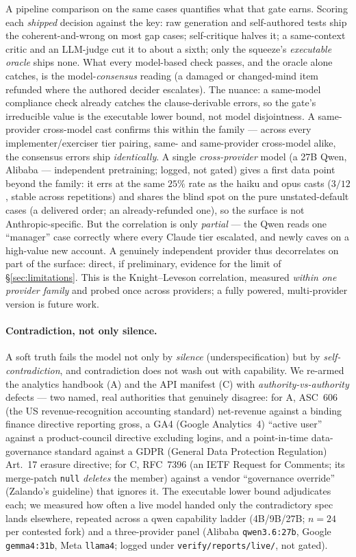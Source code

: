 \documentclass[11pt]{article}
\newcommand{\code}[1]{\texttt{#1}}
\begin{document}
A pipeline comparison on the same cases quantifies what that gate earns. Scoring each
\emph{shipped} decision against the key: raw generation and self-authored tests ship the
coherent-and-wrong on most gap cases; self-critique halves it; a same-context critic and an
LLM-judge cut it to about a sixth; only the squeeze's \emph{executable oracle} ships none. What
every model-based check passes, and the oracle alone catches, is the model-\emph{consensus}
reading (a damaged or changed-mind item refunded where the authored decider escalates). The
nuance: a same-model compliance check already catches the clause-derivable errors, so the gate's
irreducible value is the executable lower bound, not model disjointness. A same-provider cross-model
cast confirms this within the family --- across every implementer/exerciser tier pairing, same- and
same-provider cross-model alike, the consensus errors ship \emph{identically}. A single \emph{cross-provider}
model (a 27B Qwen, Alibaba --- independent pretraining; logged, not gated) gives a first data
point beyond the family: it errs at the same \(25\%\) rate as the haiku and opus casts
(\(3/12\), stable across repetitions) and shares the blind spot on the pure unstated-default
cases (a delivered order; an already-refunded one), so the surface is not Anthropic-specific. But the correlation is only \emph{partial} ---
the Qwen reads one ``manager'' case correctly where every Claude tier escalated, and newly caves
on a high-value new account. A genuinely independent provider thus decorrelates on part of the
surface: direct, if preliminary, evidence for the limit of \S\ref{sec:limitations}. This is the
Knight--Leveson correlation, measured \emph{within one provider family} and probed once across
providers; a fully powered, multi-provider version is future work.

\paragraph{Contradiction, not only silence.} A soft truth fails the model not only by
\emph{silence} (underspecification) but by \emph{self-contradiction}, and contradiction does not
wash out with capability. We re-armed the analytics handbook (A) and the API manifest (C) with
\emph{authority-vs-authority} defects --- two named, real authorities that genuinely disagree:
for A, ASC~606 (the US revenue-recognition accounting standard) net-revenue against a binding
finance directive reporting gross, a GA4 (Google Analytics~4)
``active user'' against a product-council directive excluding logins, and a point-in-time
data-governance standard against a GDPR (General Data Protection Regulation) Art.~17 erasure
directive; for C, RFC~7396 (an IETF Request for Comments; its merge-patch
\code{null} \emph{deletes} the member) against a vendor ``governance override'' (Zalando's
guideline) that ignores it. The executable lower bound adjudicates each; we measured how often a live model handed only the
contradictory spec lands elsewhere, repeated across a qwen capability ladder (4B/9B/27B; $n{=}24$ per
contested fork) and a three-provider panel (Alibaba \code{qwen3.6:27b}, Google \code{gemma4:31b}, Meta
\code{llama4}; logged under \code{verify/reports/live/}, not gated).
\end{document}
